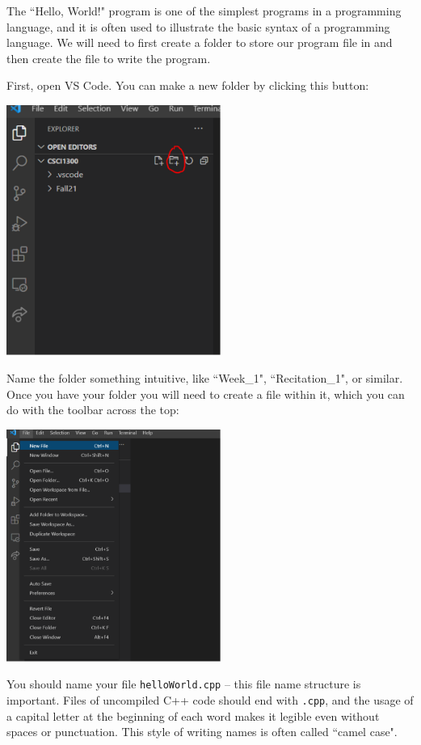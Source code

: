 
The ``Hello, World!" program is one of the simplest programs in a programming language, and it is often used to illustrate the basic syntax of a programming language. We will need to first create a folder to store our program file in and then create the file to write the program.

First, open VS Code. You can make a new folder by clicking this button: 

\includegraphics[width=7cm]{images/hello_world_2.png}

Name the folder something intuitive, like ``Week\_1", ``Recitation\_1", or similar. Once you have your folder you will need to create a file within it, which you can do with the toolbar across the top:

\includegraphics[width=7cm]{images/hello_world_4.png}

You should name your file \texttt{helloWorld.cpp} -- this file name structure is important. Files of uncompiled C++ code should end with \texttt{.cpp}, and the usage of a capital letter at the beginning of each word makes it legible even without spaces or punctuation. This style of writing names is often called ``camel case". 

